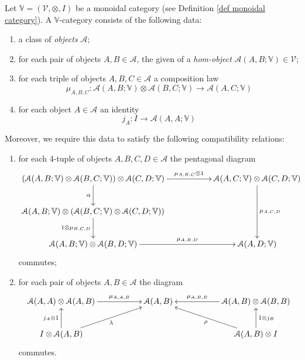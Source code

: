 \begin{refsection}
\begin{defin} \label{def enriched category}
Let $\mathbb V = (\mathcal V, \otimes, I)$ be a monoidal category (see Definition \ref{def monoidal category}). A $\mathbb V$-category consists of the following data:
\begin{enumerate}
\item a class of \emph{objects} $\mathcal A$;
\item for each pair of objects $A,B \in \mathcal A$, the given of a \emph{hom-object} $\mathcal A(A,B;\mathbb V) \in \mathcal V$;
\item for each triple of objects $A,B,C \in \mathcal A$ a composition law
\[
\mu_{A,B,C} \colon \mathcal A(A,B; \mathbb V) \otimes \mathcal A(B,C; \mathbb V) \to \mathcal A(A,C;\mathbb V)
\]
\item for each object $A \in \mathcal A$ an identity
\[
j_A \colon I \to \mathcal A(A,A;\mathbb V)
\]
\end{enumerate}
Moreover, we require this data to satisfy the following compatibility relations: 
\begin{enumerate}
\item for each 4-tuple of objects $A,B,C,D \in \mathcal A$ the pentagonal diagram
\[
\xymatrix{
(\mathcal A(A,B; \mathbb V) \otimes \mathcal A(B,C; \mathbb V)) \otimes \mathcal A(C,D;\mathbb V) \ar[d]_\alpha \ar[rr]^-{\mu_{A,B,C} \otimes 1} & & \mathcal A(A,C;\mathbb V) \otimes \mathcal A(C,D;\mathbb V) \ar[dd]^{\mu_{A,C,D}} \\
\mathcal A(A,B; \mathbb V) \otimes (\mathcal A(B,C; \mathbb V) \otimes \mathcal A(C,D;\mathbb V)) \ar[d]_{1 \otimes \mu_{B,C,D}} \\ \mathcal A(A,B;\mathbb V) \otimes \mathcal A(B,D;\mathbb V) \ar[rr]^-{\mu_{A,B,D}} & & \mathcal A(A,D;\mathbb V)
}
\]
commutes;
\item for each pair of objects $A,B \in \mathcal A$ the diagram
\[
\xymatrix{
\mathcal A(A,A) \otimes \mathcal A(A,B) \ar[rr]^-{\mu_{A,A,B}} & & \mathcal A(A,B) & & \mathcal A(A,B) \otimes \mathcal A(B,B) \ar[ll]_-{\mu_{A,B,B}} \\ I \otimes \mathcal A(A,B) \ar[u]^{j_A \otimes 1} \ar[urr]_{\lambda} & & & & \mathcal A(A,B) \otimes I \ar[u]_{1 \otimes j_B} \ar[ull]^{\rho}
}
\]
commutes.
\end{enumerate}
\end{defin}



\end{refsection}
